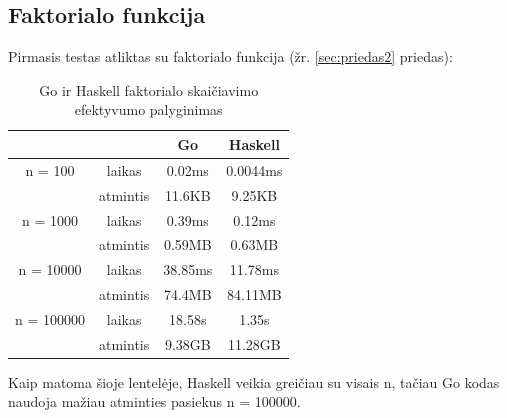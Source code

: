 \documentclass{VUMIFPSbakalaurinis}
\begin{document}
\subsection{Faktorialo funkcija}
Pirmasis testas atliktas su faktorialo funkcija (žr. \ref{sec:priedas2} priedas): 
\begin{center}
	\centering
	\begin{table}[H]
		\caption{Go ir Haskell faktorialo skaičiavimo efektyvumo palyginimas}
		\centering
	\begin{tabular}{ cccc } 
	& & \textbf{Go} & \textbf{Haskell}  \\
	\midrule
	n = 100 & laikas & 0.02ms & 0.0044ms    \\
	& atmintis & 11.6KB & 9.25KB \\
	\midrule
	n = 1000 & laikas & 0.39ms & 0.12ms  \\
	& atmintis & 0.59MB & 0.63MB \\
	\midrule
	n = 10000 & laikas & 38.85ms & 11.78ms  \\
	& atmintis & 74.4MB & 84.11MB \\
	\midrule
	n = 100000 & laikas & 18.58s & 1.35s  \\
	& atmintis & 9.38GB & 11.28GB \\
	\end{tabular}
	\centering
\end{table}
\end{center}
	Kaip matoma šioje lentelėje, Haskell veikia greičiau su visais n, tačiau Go kodas naudoja mažiau atminties pasiekus n = 100000. 
\end{document}

